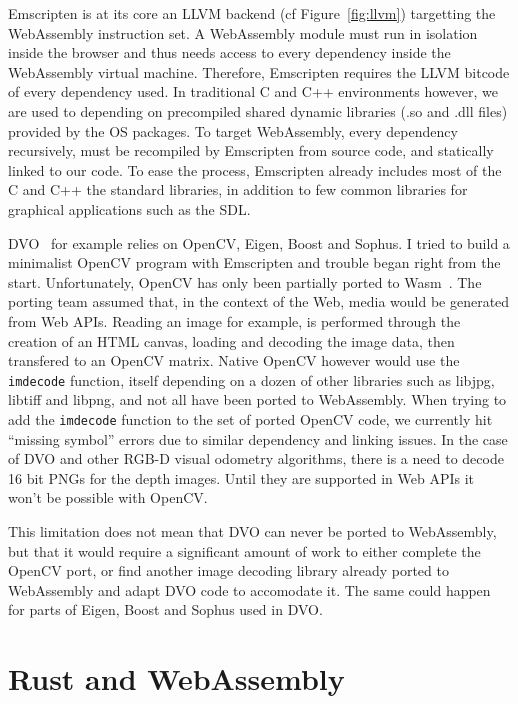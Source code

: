 Emscripten is at its core an LLVM backend (cf Figure~\ref{fig:llvm})
targetting the WebAssembly instruction set.
A WebAssembly module must run in isolation inside the browser
and thus needs access to every dependency inside the WebAssembly virtual machine.
Therefore, Emscripten requires the LLVM bitcode of every dependency used.
In traditional C and C++ environments however, we are used to depending on precompiled
shared dynamic libraries (.so and .dll files) provided by the OS packages.
To target WebAssembly, every dependency recursively, must be recompiled
by Emscripten from source code, and statically linked to our code.
To ease the process, Emscripten already includes most of the C and C++ the standard libraries,
in addition to few common libraries for graphical applications such as the SDL.

DVO~\cite{steinbrucker2011real} for example relies on OpenCV, Eigen, Boost and Sophus.
I tried to build a minimalist OpenCV program with Emscripten
and trouble began right from the start.
Unfortunately, OpenCV has only been partially ported to Wasm~\cite{taheri2018opencv}.
The porting team assumed that, in the context of the Web,
media would be generated from Web APIs.
Reading an image for example, is performed through the creation of an HTML canvas,
loading and decoding the image data, then transfered to an OpenCV matrix.
Native OpenCV however would use the \verb|imdecode| function,
itself depending on a dozen of other libraries such as libjpg, libtiff and libpng,
and not all have been ported to WebAssembly.
When trying to add the \verb|imdecode| function to the set of ported OpenCV code,
we currently hit ``missing symbol'' errors due to similar dependency and linking issues.
In the case of DVO and other RGB-D visual odometry algorithms,
there is a need to decode 16 bit PNGs for the depth images.
Until they are supported in Web APIs it won't be possible with OpenCV.

This limitation does not mean that DVO can never be ported to WebAssembly,
but that it would require a significant amount of work to either
complete the OpenCV port, or find another image decoding library
already ported to WebAssembly and adapt DVO code to accomodate it.
The same could happen for parts of Eigen, Boost and Sophus used in DVO.

\section{Rust and WebAssembly}%
\label{sec:rust_wasm}

